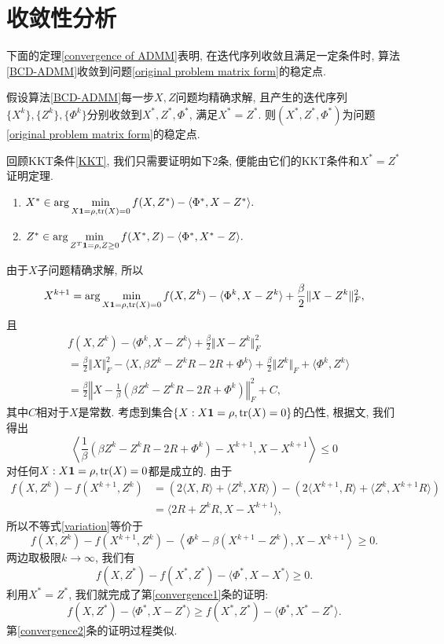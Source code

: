 \section{收敛性分析}
\label{convergence analysis}
下面的定理\ref{convergence of ADMM}表明, 在迭代序列收敛且满足一定条件时, 算法\ref{BCD-ADMM}收敛到问题\eqref{original problem matrix form}的稳定点. 
\begin{thm}\label{convergence of ADMM}
	假设算法\ref{BCD-ADMM}每一步$X,Z$问题均精确求解, 且产生的迭代序列$\{X^k\},\{Z^k\},\{\Phi^k\}$分别收敛到$X^*,Z^*,\Phi^*$, 满足$X^*=Z^*$. 则$(X^*,Z^*,\Phi^*)$为问题\eqref{original problem matrix form}的稳定点.
\end{thm}
\begin{pf}
	回顾KKT条件\eqref{KKT}, 我们只需要证明如下2条, 便能由它们的KKT条件和$X^*=Z^*$证明定理. 
	\begin{enumerate}
	\item $X^*\in\arg\min\limits_{X\mathbf{1}=\rho,\mathrm{tr}(X)=0}f(X,Z^*)-\langle\Phi^*,X-Z^*\rangle.$\label{convergence1}
	\item $Z^*\in\arg\min\limits_{Z^T\mathbf{1}=\rho,Z\ge0}f(X^*,Z)-\langle\Phi^*,X^*-Z\rangle.$\label{convergence2}
	\end{enumerate}
	由于$X$子问题精确求解, 所以
	$$X^{k+1}=\arg\min\limits_{X\mathbf{1}=\rho,\mathrm{tr}(X)=0}f(X,Z^k)-\langle\Phi^k,X-Z^k\rangle+\frac{\beta}{2}\Vert X-Z^k\Vert_F^2,$$
	且
	$$\begin{aligned}
		&f(X,Z^k)-\langle\Phi^k,X-Z^k\rangle+\frac{\beta}{2}\Vert X-Z^k\Vert_F^2\\
		&=\frac{\beta}{2}\Vert X\Vert_F^2-\langle X,\beta Z^k-Z^kR-2R+\Phi^k\rangle+\frac{\beta}{2}\Vert Z^k\Vert_F+\langle\Phi^k,Z^k\rangle\\
		&=\frac{\beta}{2}\left\Vert X-\frac{1}{\beta}(\beta Z^k-Z^kR-2R+\Phi^k)\right\Vert_F^2+C,
	\end{aligned}$$
	其中$C$相对于$X$是常数. 考虑到集合$\{X:X\mathbf{1}=\rho,\mathrm{tr}(X)=0\}$的凸性, 根据文\cite{Rockafellar2015Convex}, 我们得出
	\begin{equation}\left\langle\frac{1}{\beta}(\beta Z^k-Z^kR-2R+\Phi^k)-X^{k+1},X-X^{k+1}\right\rangle\le0\label{variation}\end{equation}
	对任何$X:X\mathbf{1}=\rho,\mathrm{tr}(X)=0$都是成立的. 由于
	$$\begin{aligned}f(X,Z^k)-f(X^{k+1},Z^k)&=\left(2\langle X,R\rangle+\langle Z^k,XR\rangle\right)-\left(2\langle X^{k+1},R\rangle+\langle Z^k,X^{k+1}R\rangle\right)\\
	&=\langle 2R+Z^kR,X-X^{k+1}\rangle,\end{aligned}$$
	所以不等式\eqref{variation}等价于
	$$f(X,Z^k)-f(X^{k+1},Z^k)-\left\langle\Phi^k-\beta(X^{k+1}-Z^k),X-X^{k+1}\right\rangle\ge0.$$
	两边取极限$k\to\infty$, 我们有
	$$f(X,Z^*)-f(X^*,Z^*)-\langle\Phi^*,X-X^*\rangle\ge0.$$
	利用$X^*=Z^*$, 我们就完成了第\ref{convergence1}条的证明:
	$$f(X,Z^*)-\langle\Phi^*,X-Z^*\rangle\ge f(X^*,Z^*)-\langle\Phi^*,X^*-Z^*\rangle.$$
	第\ref{convergence2}条的证明过程类似. 
\end{pf}